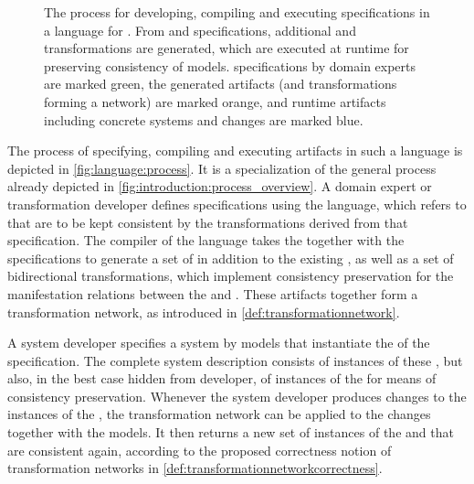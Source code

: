 \begin{figure}
    \centering
    
    \caption[Process and artifacts using a language for \commonalities]{The process for developing, compiling and executing specifications in a language for \commonalities. From \concretemetamodels and \commonalities specifications, additional \conceptmetamodels and transformations are generated, which are executed at runtime for preserving consistency of models.
    \Commonalities specifications by domain experts are marked green, the generated artifacts (\conceptmetamodels and transformations forming a network) are marked orange, and runtime artifacts including concrete systems and changes are marked blue.}
    \label{fig:language:process}
\end{figure}

The process of specifying, compiling and executing artifacts in such a language is depicted in \autoref{fig:language:process}.
It is a specialization of the general process already depicted in \autoref{fig:introduction:process_overview}.
A domain expert or transformation developer defines \commonalities specifications using the language, which refers to \concretemetamodels that are to be kept consistent by the transformations derived from that specification.
The compiler of the language takes the \concretemetamodels together with the specifications to generate a set of \conceptmetamodels in addition to the existing \concretemetamodels, as well as a set of bidirectional transformations, which implement consistency preservation for the manifestation relations between the \conceptmetamodels and \concretemetamodels.
These artifacts together form a transformation network, as introduced in \autoref{def:transformationnetwork}.

A system developer specifies a system by models that instantiate the \concretemetamodels of the \commonalities specification.
The complete system description consists of instances of these \concretemetamodels, but also, in the best case hidden from developer, of instances of the \conceptmetamodels for means of consistency preservation.
Whenever the system developer produces changes to the instances of the \concretemetamodels, the transformation network can be applied to the changes together with the models.
It then returns a new set of instances of the \concretemetamodel and \conceptmetamodels that are consistent again, according to the proposed correctness notion of transformation networks in \autoref{def:transformationnetworkcorrectness}.


